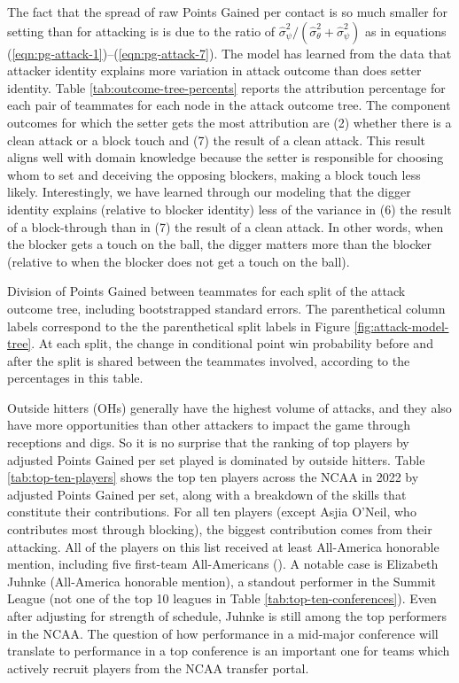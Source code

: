 \documentclass[USenglish]{article}
\theoremstyle{dgthm}
\theoremstyle{dgdef}
\begin{document}
The fact that the spread of raw Points Gained per contact is so much smaller for setting than for attacking is is due to the ratio of $\hat\sigma^2_\psi / (\hat\sigma^2_\theta + \hat\sigma^2_\psi)$ as in equations (\ref{eqn:pg-attack-1})--(\ref{eqn:pg-attack-7}). The model has learned from the data that attacker identity explains more variation in attack outcome than does setter identity. Table \ref{tab:outcome-tree-percents} reports the attribution percentage for each pair of teammates for each node in the attack outcome tree. The component outcomes for which the setter gets the most attribution are (2) whether there is a clean attack or a block touch and (7) the result of a clean attack. This result aligns well with domain knowledge because the setter is responsible for choosing whom to set and deceiving the opposing blockers, making a block touch less likely. Interestingly, we have learned through our modeling that the digger identity explains (relative to blocker identity) less of the variance in (6) the result of a block-through than in (7) the result of a clean attack. In other words, when the blocker gets a touch on the ball, the digger matters more than the blocker (relative to when the blocker does not get a touch on the ball).

\begin{table}
    \centering
    
    \caption{Division of Points Gained between teammates for each split of the attack outcome tree, including bootstrapped standard errors. The parenthetical column labels correspond to the the parenthetical split labels in Figure \ref{fig:attack-model-tree}. At each split, the change in conditional point win probability before and after the split is shared between the teammates involved, according to the percentages in this table.}
    \label{tab:outcome-tree-percents}
\end{table}

Outside hitters (OHs) generally have the highest volume of attacks, and they also have more opportunities than other attackers to impact the game through receptions and digs. So it is no surprise that the ranking of top players by adjusted Points Gained per set played is dominated by outside hitters. Table \ref{tab:top-ten-players} shows the top ten players across the NCAA in 2022 by adjusted Points Gained per set, along with a breakdown of the skills that constitute their contributions. For all ten players (except Asjia O'Neil, who contributes most through blocking), the biggest contribution comes from their attacking. All of the players on this list received at least All-America honorable mention, including five first-team All-Americans (\cite{avca_all_america}). A notable case is Elizabeth Juhnke (All-America honorable mention), a standout performer in the Summit League (not one of the top 10 leagues in Table \ref{tab:top-ten-conferences}). Even after adjusting for strength of schedule, Juhnke is still among the top performers in the NCAA. The question of how performance in a mid-major conference will translate to performance in a top conference is an important one for teams which actively recruit players from the NCAA transfer portal.
\end{document}
